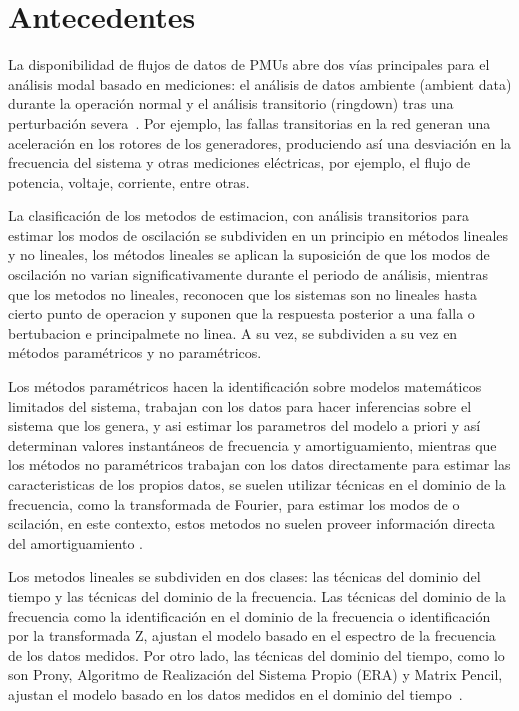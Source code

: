 \section{Antecedentes}

La disponibilidad de flujos de datos de PMUs abre dos vías principales para el análisis modal basado en mediciones: 
el análisis de datos ambiente (ambient data) durante la operación normal y el análisis transitorio (ringdown) tras 
una perturbación severa~\cite{ieee2012,Thambirajah2010}. Por ejemplo, las fallas transitorias en la red generan una 
aceleración en los rotores de los generadores, produciendo así una desviación en la frecuencia del 
sistema y otras mediciones eléctricas, por ejemplo, el flujo de potencia, voltaje, corriente, entre otras.

La clasificación de los metodos de estimacion, con análisis transitorios para estimar los modos de oscilación 
se subdividen en un principio en métodos lineales y no lineales, los métodos lineales se aplican la suposición
de que los modos de oscilación no varian significativamente durante el periodo de análisis, mientras que los metodos 
no lineales, reconocen que los sistemas son no lineales hasta cierto punto de operacion y suponen que la respuesta 
posterior a una falla o bertubacion e principalmete no linea. A su vez, se subdividen a su vez en métodos 
paramétricos y no paramétricos\cite{Thambirajah2010}. 

Los métodos paramétricos hacen la identificación sobre modelos matemáticos limitados del sistema, 
trabajan con los datos para hacer inferencias sobre el sistema que los genera, y asi estimar los parametros 
del modelo a priori y así determinan valores instantáneos de frecuencia y amortiguamiento, mientras que los métodos 
no paramétricos trabajan con los datos directamente para estimar las caracteristicas de los propios datos, se suelen 
utilizar técnicas en el dominio de la frecuencia, como la transformada de Fourier, para estimar los modos de o
scilación, en este contexto, estos metodos no suelen proveer información directa del amortiguamiento \cite{Thambirajah2010}. 

Los metodos lineales se subdividen en dos clases: las técnicas del dominio 
del tiempo y las técnicas del dominio de la frecuencia. Las técnicas del dominio de la frecuencia como la 
identificación en el dominio de la frecuencia o identificación por la transformada Z, ajustan el 
modelo basado en el espectro de la frecuencia de los datos medidos. Por otro lado, las técnicas del 
dominio del tiempo, como lo son Prony, Algoritmo de Realización del Sistema Propio (ERA) y Matrix Pencil, 
ajustan el modelo basado en los datos medidos en el dominio del tiempo~\cite{Thambirajah2010}.

